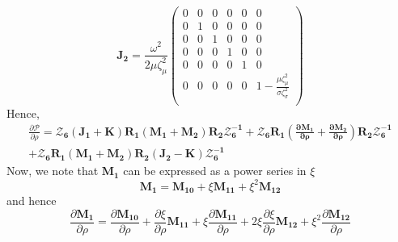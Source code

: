 \documentclass[a4paper,10pt]{article}
\begin{document}
\begin{equation}
\mathbf{J_2} = \frac{\omega^2}{2\mu \zeta_\mu^2}\left(
\begin{array}{cccccc}
 0 & 0 & 0 & 0 & 0 & 0 \\
 0 & 1 & 0 & 0 & 0 & 0 \\
 0 & 0 & 1 & 0 & 0 & 0 \\
 0 & 0 & 0 & 1 & 0 & 0 \\
 0 & 0 & 0 & 0 & 1 & 0 \\
 0 & 0 & 0 & 0 & 0 & 1- \frac{\mu \zeta_\mu^2}{\sigma \zeta_\sigma^2}\\
\end{array}
\right)
\end{equation}
Hence,
\begin{multline}
\frac{\partial \boldsymbol{\mathcal{P}}}{\partial \rho} =  \boldsymbol{\mathcal{Z}_6}(\mathbf{J_1+K})\mathbf{R_1 (M_1+M_2)R_2}\boldsymbol{\mathcal{Z}}^\mathbf{-1}_\mathbf{6}+ \boldsymbol{\mathcal{Z}_6} \mathbf{R_1 (\frac{\partial M_1}{\partial \rho}+\frac{\partial M_2}{\partial \rho})R_2}\boldsymbol{\mathcal{Z}}^\mathbf{-1}_\mathbf{6}\\+ \boldsymbol{\mathcal{Z}_6} \mathbf{R_1 (M_1+M_2) R_2 (J_2-K)}\boldsymbol{\mathcal{Z}}^\mathbf{-1}_\mathbf{6}
\end{multline}
Now, we note that $\mathbf{M_1}$ can be expressed as a power series in $\xi$
\begin{equation}
\mathbf{M_1} = \mathbf{M_{10}} + \xi \mathbf{M_{11}} + \xi^2 \mathbf{M_{12}}
\end{equation}
and hence
\begin{equation}
\frac{\partial \mathbf{M_1}}{\partial \rho} = \frac{\partial \mathbf{M_{10}}}{\partial \rho} + \frac{\partial \xi}{\partial \rho}\mathbf{M_{11}}+\xi \frac{\partial\mathbf{M_{11}}}{\partial \rho}+2\xi \frac{\partial\xi}{\partial \rho}\mathbf{M_{12}}+\xi^2 \frac{\partial \mathbf{M_{12}}}{\partial \rho}
\end{equation}
\end{document}
